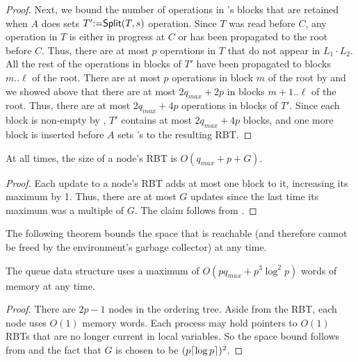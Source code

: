\begin{proof}
Next, we bound the number of operations in 's blocks that are retained when $A$ does sets
$T'\mbox{:=}{\sf Split}(T,s)$ operation.
Since $T$ was read before $C$, any operation in $T$ is either in progress at $C$ or has been propagated to the root before $C$.
Thus, there are at most $p$ operations in $T$ that do not appear in $L_1\cdot L_2$.
All the rest of the operations in blocks of $T'$ have been propagated to blocks $m..\ell$ of the root.
There are at most $p$ operations in block $m$ of the root by 
and we showed above that there are at most $2q_{max} + 2p$ in blocks 
$m+1..\ell$ of the root.
Thus, there are at most $2q_{max}+4p$ operations in blocks of $T'$.
Since each block is non-empty by , $T'$ contains at most $2q_{max}+4p$ blocks, and one more 
block is inserted before $A$ sets 's  to the resulting RBT.
\end{proof}


\begin{corollary}\label{RBTbound}
At all times, the size of a node's RBT is $O(q_{max}+p+G)$. 
\end{corollary}
\begin{proof}
Each update to a node's RBT adds at most one block to it, increasing its maximum  by 1.
Thus, there are at most $G$ updates since the last time its maximum  was a multiple of $G$.
The claim follows from .
\end{proof}

The following theorem bounds the space that is reachable (and therefore cannot be freed by the environment's garbage collector) at any time.

\begin{mytheorem}\label{spaceBound}
The queue data structure uses a maximum of $O(pq_{max}+p^3\log^2 p)$ words of memory at any time.
\end{mytheorem}
\begin{proof}
There are $2p-1$ nodes in the ordering tree.  Aside from the RBT, each node uses $O(1)$ memory words.
Each process may hold pointers to $O(1)$ RBTs that are no longer current in local variables.
So the space bound follows from  and the fact that $G$ is chosen
to be $(p\lceil \log p \rceil)^2$.
\end{proof}

